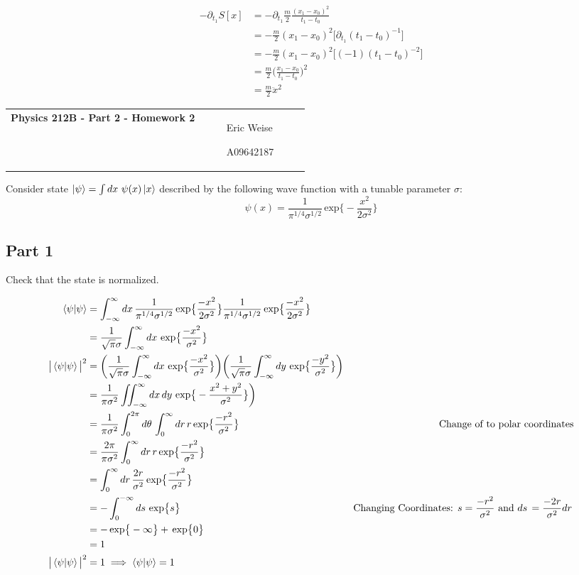 \documentclass{article}
\newcommand{\assignment}[2]{
    \newpage
    \begin{tabular}{p{0.65\linewidth}p{0.25\linewidth}}
        {\bf\LARGE Physics 212B - Part #1 - Homework #2 }
        &
        \parbox[b]{0.24\textwidth}{
            \hfill Eric Weise

            \hfill A09642187
            }
    \end{tabular}
    \vspace{12pt}
    \newline
}
\newcommand{\D}[1]{{d#1 \,}}
\renewcommand{\exp}[1]{\,\text{exp} \big\{ #1 \big\} }
\begin{document}
\begin{align*}
    -\partial_{t_1} S[x]
    &= -\partial_{t_1} \frac{m}{2} \frac{(x_1 - x_0)^2}{t_1 - t_0} \\
    &= - \frac{m}{2} (x_1 - x_0)^2 \big[ \partial_{t_1} (t_1 - t_0)^{-1} \big] \\
    &= - \frac{m}{2} (x_1 - x_0)^2 \big[ (-1) (t_1 - t_0)^{-2} \big] \\
    &= \frac{m}{2} \big(\frac{x_1 - x_0}{t_1 - t_0}\big)^2 \\
    &= \frac{m}{2} \ddot{x}^2
\end{align*}



\assignment{2}{2}

Consider state
\( \ket{\psi} = \int \D{x} \, \psi(x) \ket{x} \)
described by the following wave function with a tunable parameter $\sigma$:
\[ \psi(x) = \frac{1}{\pi^{1/4} \sigma^{1/2}} \exp{ -\frac{x^2}{2\sigma^2} } \]

\subsection*{Part 1}
Check that the state is normalized.

\begin{align*}
    \braket{\psi|\psi}
    & = \int_{-\infty}^{\infty} \D{x} \frac{1}{\pi^{1/4} \sigma^{1/2}} \exp{ \frac{-x^2}{2\sigma^2} }
        \frac{1}{\pi^{1/4} \sigma^{1/2}} \exp{ \frac{-x^2}{2\sigma^2} } \\
    & = \frac{1}{\sqrt{\pi} \sigma} \int_{-\infty}^{\infty} \D{x} \exp{ \frac{-x^2}{\sigma^2} } \\
    \big| \braket{\psi|\psi} \big| ^2
    & = \bigg( \frac{1}{\sqrt{\pi} \sigma} \int_{-\infty}^{\infty} \D{x} \exp{ \frac{-x^2}{\sigma^2} } \bigg)
        \bigg( \frac{1}{\sqrt{\pi} \sigma} \int_{-\infty}^{\infty} \D{y} \exp{ \frac{-y^2}{\sigma^2} } \bigg) \\
    & = \frac{1}{\pi\sigma^2} \iint_{-\infty}^{\infty} \D{x} \D{y} \exp{ -\frac{x^2 + y^2}{\sigma^2} } \bigg) \\
    & = \frac{1}{\pi\sigma^2} \int_{0}^{2\pi}\D{\theta} \int_{0}^{\infty} \D{r} r \exp{ \frac{-r^2}{\sigma^2} }
        & \text{Change of to polar coordinates}\\
    & = \frac{2\pi}{\pi\sigma^2} \int_{0}^{\infty} \D{r} r \exp{ \frac{-r^2}{\sigma^2} } \\
    & = \int_{0}^{\infty} \D{r} \frac{2r}{\sigma^2} \exp{ \frac{-r^2}{\sigma^2} } \\
    & = -\int_{0}^{-\infty} \D{s} \exp{s}
        & \text{Changing Coordinates: \( s=\frac{-r^2}{\sigma^2} \) and \( \D{s} = \frac{-2r}{\sigma^2} \D{r} \)} \\
    & = -\exp{-\infty} + \exp{0} \\
    & = 1 \\
    \big| \braket{\psi|\psi} \big| ^2 &= 1 \implies \braket{\psi|\psi} = 1
\end{align*}
\end{document}
